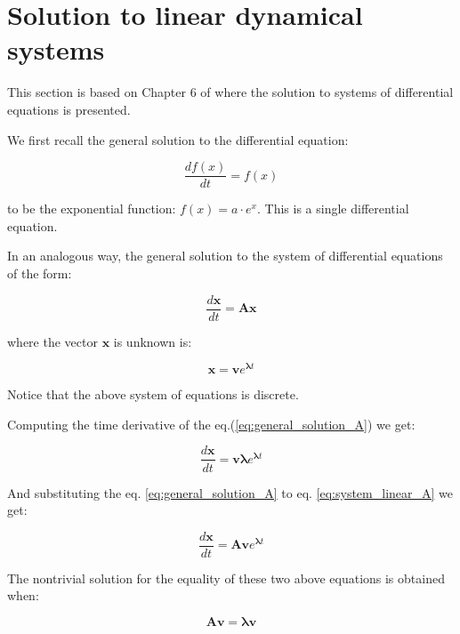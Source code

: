 \documentclass[10pt,twocolumn]{article}
\begin{document}
\section{Solution to linear dynamical systems} \label{app:A}

This section is based on Chapter 6 of \cite{Prof_Gilbert_Strang} where the solution to systems of differential equations is presented.

We first recall the general solution to the differential equation:

\begin{equation} \label{eq:DE_exp}
\frac{d f(x)}{dt} = f(x)
\end{equation}

to be the exponential function: $f(x) = a \cdot e^{x}$. This is a single differential equation.


In an analogous way, the general solution to the system of differential equations of the form:

\begin{equation} \label{eq:system_linear_A}
\frac{d \mathbf{x}}{dt} = \mathbf{A} \mathbf{x}
\end{equation}

where the vector $\mathbf{x}$ is unknown is:

\begin{equation} \label{eq:general_solution_A}
\mathbf{x} = \mathbf{v} e^{\bm{\lambda} t}
\end{equation}

Notice that the above system of equations is discrete.

Computing the time derivative of the eq.(\ref{eq:general_solution_A}) we get:

\begin{equation} \label{eq:sub1}
\frac{d \mathbf{x}}{dt} = \mathbf{v} \bm{\lambda} e^{\bm{\lambda} t}
\end{equation}

And substituting the eq. \ref{eq:general_solution_A} to eq. \ref{eq:system_linear_A} we get:

\begin{equation} \label{eq:sub2}
\frac{d \mathbf{x}}{dt} = \mathbf{A} \mathbf{v} e^{\bm{\lambda} t}
\end{equation}

The nontrivial solution for the equality of these two above equations is obtained when:

\begin{equation} \label{eq:eigval}
\mathbf{A} \mathbf{v} = \bm{\lambda} \mathbf{v} 
\end{equation}
\end{document}
